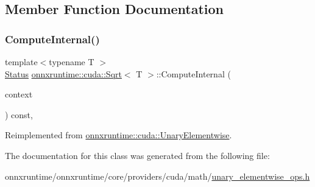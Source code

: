 \subsection{Member Function Documentation}
\mbox{\label{classonnxruntime_1_1cuda_1_1Sqrt_a8bc2beeaa3b9aecd40e1ad87a118b723}} 
\subsubsection{\texorpdfstring{Compute\+Internal()}{ComputeInternal()}}
{\footnotesize\ttfamily template$<$typename T $>$ \\
\mbox{\hyperlink{classonnxruntime_1_1common_1_1Status}{Status}} \mbox{\hyperlink{classonnxruntime_1_1cuda_1_1Sqrt}{onnxruntime\+::cuda\+::\+Sqrt}}$<$ T $>$\+::Compute\+Internal (\begin{DoxyParamCaption}\item[{\mbox{\hyperlink{classonnxruntime_1_1OpKernelContext}{Op\+Kernel\+Context}} $\ast$}]{context }\end{DoxyParamCaption}) const\hspace{0.3cm}{\ttfamily [override]}, {\ttfamily [virtual]}}



Reimplemented from \mbox{\hyperlink{classonnxruntime_1_1cuda_1_1UnaryElementwise_abbbcb29c3937e2ac9e2ad768d9c69fca}{onnxruntime\+::cuda\+::\+Unary\+Elementwise}}.



The documentation for this class was generated from the following file\+:\begin{DoxyCompactItemize}
\item 
onnxruntime/onnxruntime/core/providers/cuda/math/\mbox{\hyperlink{unary__elementwise__ops_8h}{unary\+\_\+elementwise\+\_\+ops.\+h}}\end{DoxyCompactItemize}
